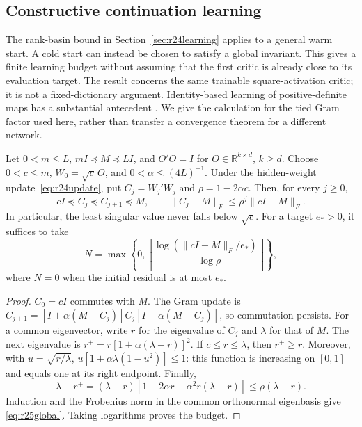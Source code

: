 \subsection{Constructive continuation learning}\label{sec:r25constructive}
The rank-basin bound in Section~\ref{sec:r24learning} applies to a general
warm start. A cold start can instead be chosen to satisfy a global invariant.
This gives a finite learning budget without assuming that the first critic
is already close to its evaluation target. The result concerns the same
trainable square-activation critic; it is not a fixed-dictionary argument.
Identity-based learning of positive-definite maps has a substantial antecedent
\citep{r25bartlett2018}. We give the calculation for the tied Gram factor used
here, rather than transfer a convergence theorem for a different network.

\begin{proposition}\label{prop:r25isotropic}
Let $0<m\leq L$, $mI\preceq M\preceq LI$, and $O'O=I$ for
$O\in\mathbb R^{k\times d}$, $k\geq d$. Choose $0<c\leq m$,
$W_0=\sqrt c\,O$, and $0<\alpha\leq(4L)^{-1}$. Under the hidden-weight
update~\eqref{eq:r24update}, put $C_j=W_j'W_j$ and $\rho=1-2\alpha c$.
Then, for every $j\geq0$,
\begin{equation}
 cI\preceq C_j\preceq C_{j+1}\preceq M,\qquad
 \|C_j-M\|_F\leq\rho^j\|cI-M\|_F.
 \label{eq:r25global}
\end{equation}
In particular, the least singular value never falls below $\sqrt c$.
For a target $e_*>0$, it suffices to take
\begin{equation}
 N=\max\left\{0,\left\lceil
       \frac{\log(\|cI-M\|_F/e_*)}{-\log\rho}
       \right\rceil\right\},
 \label{eq:r25budget}
\end{equation}
where $N=0$ when the initial residual is at most $e_*$.
\end{proposition}

\begin{proof}
$C_0=cI$ commutes with $M$. The Gram update is
$C_{j+1}=[I+\alpha(M-C_j)]C_j[I+\alpha(M-C_j)]$, so commutation
persists. For a common eigenvector, write $r$ for the eigenvalue of $C_j$
and $\lambda$ for that of $M$. The next eigenvalue is
$r^+=r[1+\alpha(\lambda-r)]^2$. If $c\leq r\leq\lambda$, then
$r^+\geq r$. Moreover, with $u=\sqrt{r/\lambda}$,
$u[1+\alpha\lambda(1-u^2)]\leq1$: this function is increasing on
$[0,1]$ and equals one at its right endpoint. Finally,
\[
 \lambda-r^+=(\lambda-r)
       [1-2\alpha r-\alpha^2r(\lambda-r)]
       \leq\rho(\lambda-r).
\]
Induction and the Frobenius norm in the common orthonormal eigenbasis give
\eqref{eq:r25global}. Taking logarithms proves the budget.
\end{proof}

